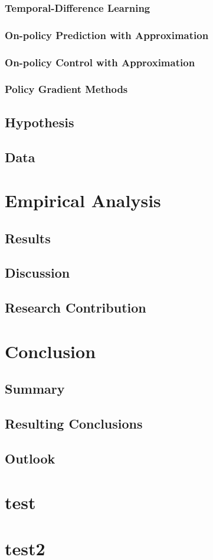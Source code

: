 \documentclass{seal_thesis}
\begin{document}
\subsection{Temporal-Difference Learning}

\subsection{On-policy Prediction with Approximation}

\subsection{On-policy Control with Approximation}

\subsection{Policy Gradient Methods}

\section{Hypothesis}
\section{Data}

\chapter{Empirical Analysis}
\label{ch:empirical_analysis}



\section{Results}
\section{Discussion}
\section{Research Contribution}

\chapter{Conclusion}
\label{ch:conclusion}

\section{Summary}
\section{Resulting Conclusions}
\section{Outlook}

\appendix

\chapter{test}
\chapter{test2}

\backmatter




\end{document}
